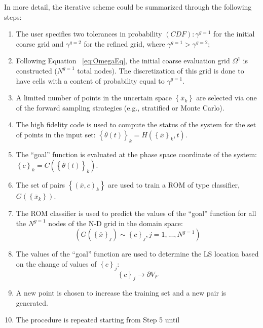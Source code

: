 In more detail, the iterative scheme could be summarized through the 
following steps:
\begin{enumerate}
  \item The user specifies two tolerances in probability $(CDF):
  \gamma^{g=1}$ for the initial coarse grid and $\gamma^{g=2}$
  for the refined grid, where  $ \gamma^{g=1} >  \gamma^{g=2}$;
  \item Following Equation ~\ref{eq:OmegaEq}, the initial coarse evaluation 
  grid $\Omega^{1}$ is constructed ($N^{g=1}$ total nodes). The 
  discretization of this grid is done to have cells with a content of 
  probability equal to $\gamma^{g=1}$.
  \item A limited number of points in the uncertain space $\left \{ 
  \overline{x}_{k} \right \}$ are selected via one of the forward 
  sampling strategies (e.g., stratified or Monte Carlo).
  \item The high fidelity code is used to compute the status of the 
  system for the set of points in the input set: 
  $
  \left \{ \overline{\theta}(t)\right \}_{k} = H\left ( \left \{ \overline{x} \right 
  \}_{k},t \right )
  $.
  \item The ``goal'' function is evaluated at the phase space coordinate 
  of the system:
  $\left \{ c \right \}_{k} = C\left ( \left \{ \overline{\theta}(t)\right \}_{k} 
  \right )$.
   \item The set of pairs $\left \{ \left ( \overline{x},c \right )_{k} \right \}$
   are used to train a ROM of type classifier, $G\left ( \left \{ 
   \overline{x}_{k} \right \} \right )$.
   \item The ROM classifier is used to predict the values of the ``goal''  
   function for all the $N^{g=1}$ nodes of the N-D grid in the domain 
   space:
   \begin{equation}
   \left (G\left ( \left \{ \overline{x} \right \}_{j} \right ) \sim \left \{ c \right 
   \}_{j}, j=1,...,N^{g=1}  \right )
    \end{equation}
    \item The values of the ``goal''  function are used to determine the 
    LS location based on the change of values of  $\left \{ c \right 
    \}_{j}$:
    \begin{equation}
    \left \{ c \right \}_{j}\rightarrow \partial V_{F}
     \end{equation}
     \item A new point is chosen to increase the training set and a new 
     pair is generated.    
     \item The procedure is repeated starting from Step 5 until 

\end{enumerate}
